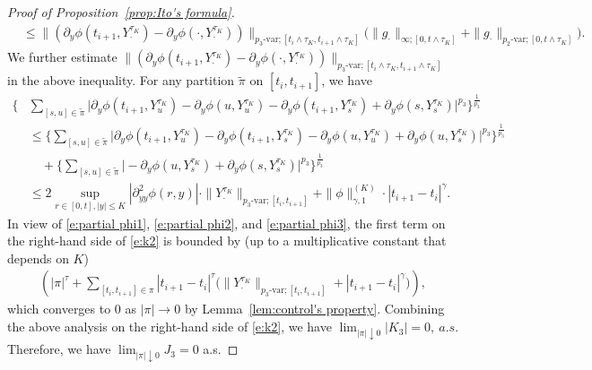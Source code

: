 \documentclass[11pt,reqno]{amsart}
\numberwithin{equation}{section}
\begin{document}
\begin{proof}[Proof of Proposition~\ref{prop:Ito's formula}]
\begin{align}
\nonumber
& \le \big\|(\partial_{y}\phi(t_{i+1},Y^{\tau_{K}}_{\cdot}) - \partial_{y}\phi(\cdot,Y^{\tau_{K}}_{\cdot}))\big\|_{p_{3}\text{-var};[t_{i}\land\tau_{K},t_{i+1}\land\tau_{K}]}\Big(\|g_{\cdot}\|_{\infty ;[0,t\land\tau_{K}]}  + \|g_{\cdot}\|_{p_{2}\text{-var} ;[0,t\land\tau_{K}]} \Big).
\end{align}
We further estimate $	\big\|(\partial_{y}\phi(t_{i+1},Y^{\tau_{K}}_{\cdot}) - \partial_{y}\phi(\cdot,Y^{\tau_{K}}_{\cdot}))\big\|_{p_{3}\text{-var};[t_{i}\land\tau_{K},t_{i+1}\land\tau_{K}]}$ in the above inequality.  For any partition $\tilde \pi$ on $[t_i, t_{i+1}]$, we have
\begin{equation}\label{e:partial phi3}
\begin{aligned}
\bigg\{&\sum_{[s,u]\in \tilde \pi}\Big|\partial_{y}\phi(t_{i+1},Y^{\tau_{K}}_{u}) - \partial_{y}\phi(u,Y^{\tau_{K}}_{u}) - \partial_{y}\phi(t_{i+1},Y^{\tau_{K}}_{s}) + \partial_{y}\phi(s,Y^{\tau_{K}}_{s})\Big|^{p_{3}}\bigg\}^{\frac{1}{p_{3}}}\\
&\le \bigg\{\sum_{[s,u]\in \tilde \pi}\Big|\partial_{y}\phi(t_{i+1},Y^{\tau_{K}}_{u}) - \partial_{y}\phi(t_{i+1},Y^{\tau_{K}}_{s}) - \partial_{y}\phi(u,Y^{\tau_{K}}_{u}) + \partial_{y}\phi(u,Y^{\tau_{K}}_{s})\Big|^{p_{3}}\bigg\}^{\frac{1}{p_{3}}}\\
&\quad+ \bigg\{\sum_{[s,u]\in \tilde \pi}\Big|-\partial_{y}\phi(u,Y^{\tau_{K}}_{s}) + \partial_{y}\phi(s,Y^{\tau_{K}}_{s})\Big|^{p_{3}}\bigg\}^{\frac{1}{p_{3}}}\\
&\le 2\sup_{r\in[0,t],|y|\le K}|\partial^{2}_{yy}\phi(r,y)|\cdot \|Y^{\tau_{K}}_{\cdot}\|_{p_{3}\text{-var};[t_{i},t_{i+1}]} + \|\phi\|^{(K)}_{\gamma,1}\cdot |t_{i+1}-t_{i}|^{\gamma}.
\end{aligned}
\end{equation}
In view of \eqref{e:partial phi1}, \eqref{e:partial phi2}, and \eqref{e:partial phi3}, the first term on the right-hand side of \eqref{e:k2} is bounded by (up to a multiplicative constant that depends on $K$)
\begin{align*}
\left(|\pi|^{\tau} +  \sum_{[t_{i},t_{i+1}]\in\pi}|t_{i+1}-t_{i}|^{\tau}\Big(\|Y^{\tau_{K}}_{\cdot}\|_{p_{3}\text{-var};[t_{i},t_{i+1}]} +|t_{i+1}-t_{i}|^{\gamma}\Big)\right),
\end{align*}
which converges to 0 as $|\pi|\to0$ by Lemma~\ref{lem:control's property}.  
Combining the above analysis on the right-hand side of \eqref{e:k2}, we have
$\lim_{|\pi|\downarrow 0}|K_{3}|  = 0,\  a.s.$ Therefore, we have $\lim_{|\pi|\downarrow 0} J_3 = 0$ a.s.


\end{proof}
\end{document}
